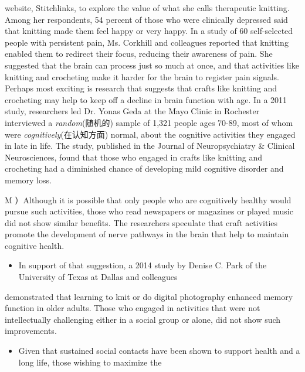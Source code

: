 \documentclass[UTF8,11pt]{ctexart}
\begin{document}
website, Stitchlinks, to explore the value of what she calls therapeutic knitting. Among her respondents, 54 percent of those who were clinically depressed said that knitting made them feel happy or very happy. In a study of 60 self-selected people with persistent pain, Ms. Corkhill and colleagues reported that knitting enabled them to redirect their focus, reducing their awareness of pain. She suggested that the brain can process just so much at once, and that activities like knitting and crocheting make it harder for the brain to register pain signals. Perhaps most exciting is research that suggests that crafts like knitting and crocheting may help to keep off a decline in brain function with age. In a 2011 study, researchers led Dr. Yonas Geda at the Mayo Clinic in Rochester interviewed a\textit{ random}(随机的) sample of 1,321 people ages 70-89, most of whom were\textit{ cognitively}(在认知方面) normal, about the cognitive activities they engaged in late in life. The study, published in the Journal of Neuropsychiatry \& Clinical Neurosciences, found that those who engaged in crafts like knitting and crocheting had a diminished chance of developing mild cognitive disorder and memory loss.


M ）Although it is possible that only people who are cognitively healthy would pursue such activities, those who read newspapers or magazines or played music did not show similar benefits. The researchers speculate that craft activities promote the development of nerve pathways in the brain that help to maintain cognitive health.


\begin{itemize}[leftmargin=2em,itemsep=.2em,topsep=.4em]\item[N.] In support of that suggestion, a 2014 study by Denise C. Park of the University of Texas at Dallas and colleagues
\end{itemize}

demonstrated that learning to knit or do digital photography enhanced memory function in older adults. Those who engaged in activities that were not intellectually challenging either in a social group or alone, did not show such improvements.


\begin{itemize}[leftmargin=2em,itemsep=.2em,topsep=.4em]\item[O.] Given that sustained social contacts have been shown to support health and a long life, those wishing to maximize the
\end{itemize}
\end{document}
